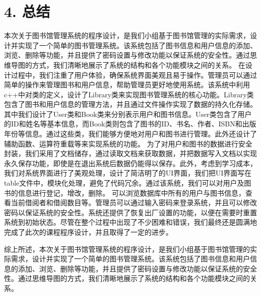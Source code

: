 \documentclass{article}
\begin{document}
\section*{4. 总结}

本次关于图书馆管理系统的程序设计，是我们小组基于图书馆管理的实际需求，设计并实现了一个简单的图书管理系统。该系统包括了图书信息和用户信息的添加、浏览、删除等功能，并且提供了密码设置与修改功能以保证系统的安全性。通过思维导图的方式，我们清晰地展示了系统的结构和各个功能模块之间的关系。
在设计过程中，我们注重了用户体验，确保系统界面美观且易于操作。管理员可以通过简单的操作来管理图书和用户信息，帮助管理员更好地使用系统。该系统中利用c++中对类的定义，设计了Library类来实现图书管理系统的核心功能。Library类包含了图书和用户信息的管理方法，并且通过文件操作实现了数据的持久化存储。
其中我们设计了User类和Book类来分别表示用户和图书信息。User类包含了用户的ID和姓名等基本信息，而Book类则包含了图书的ID、书名、作者、ISBN和出版年份等信息。通过这些类，我们能够方便地对用户和图书进行管理。此外还设计了辅助函数、运算符重载等来实现系统的功能。
为了对用户和图书的数据进行安全封装，我们采用了文档储存，通过读取文档来获取数据，并把数据写入文档以实现永久保存功能，即使是在退出系统后数据仍能得以保存。此外，考虑到学习成本，我们对系统界面进行了美观处理，设计了简洁明了的UI界面，我们把UI界面写在table文件中，模块化处理，避免了代码冗余。通过该系统，我们可以对用户及图书的信息进行登记，增改，删除。
可以浏览数据库中所有的用户与图书信息，查看当前借阅者和借阅数目等。管理员可以通过输入密码来登录系统，并且可以修改密码以保证系统的安全性。系统还提供了恢复出厂设置的功能，以便在需要时重置系统到初始状态。尽管在整个过程中出现了不少困难和错误，我们最终还是圆满地完成了此次的课程程序设计，并且取得了一定的进步。

综上所述，本次关于图书馆管理系统的程序设计，是我们小组基于图书馆管理的实际需求，设计并实现了一个简单的图书管理系统。该系统包括了图书信息和用户信息的添加、浏览、删除等功能，并且提供了密码设置与修改功能以保证系统的安全性。通过思维导图的方式，我们清晰地展示了系统的结构和各个功能模块之间的关系。 
\end{document}
